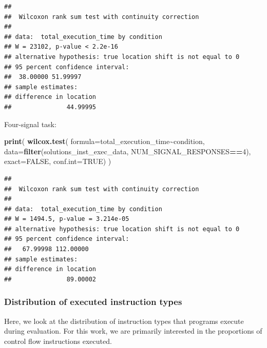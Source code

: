 \documentclass[
]{book}
\newenvironment{Shaded}{\begin{snugshade}}{\end{snugshade}}
\newcommand{\DataTypeTok}[1]{\textcolor[rgb]{0.13,0.29,0.53}{#1}}
\newcommand{\DecValTok}[1]{\textcolor[rgb]{0.00,0.00,0.81}{#1}}
\newcommand{\KeywordTok}[1]{\textcolor[rgb]{0.13,0.29,0.53}{\textbf{#1}}}
\newcommand{\NormalTok}[1]{#1}
\newcommand{\OperatorTok}[1]{\textcolor[rgb]{0.81,0.36,0.00}{\textbf{#1}}}
\newcommand{\OtherTok}[1]{\textcolor[rgb]{0.56,0.35,0.01}{#1}}
\begin{document}
\begin{verbatim}
## 
##  Wilcoxon rank sum test with continuity correction
## 
## data:  total_execution_time by condition
## W = 23102, p-value < 2.2e-16
## alternative hypothesis: true location shift is not equal to 0
## 95 percent confidence interval:
##  38.00000 51.99997
## sample estimates:
## difference in location 
##               44.99995
\end{verbatim}

Four-signal task:

\begin{Shaded}
\begin{Highlighting}[]
\KeywordTok{print}\NormalTok{(}
  \KeywordTok{wilcox.test}\NormalTok{(}
    \DataTypeTok{formula=}\NormalTok{total\_execution\_time}\OperatorTok{\textasciitilde{}}\NormalTok{condition,}
    \DataTypeTok{data=}\KeywordTok{filter}\NormalTok{(solutions\_inst\_exec\_data, NUM\_SIGNAL\_RESPONSES}\OperatorTok{==}\DecValTok{4}\NormalTok{),}
    \DataTypeTok{exact=}\OtherTok{FALSE}\NormalTok{,}
    \DataTypeTok{conf.int=}\OtherTok{TRUE}\NormalTok{)}
\NormalTok{)}
\end{Highlighting}
\end{Shaded}

\begin{verbatim}
## 
##  Wilcoxon rank sum test with continuity correction
## 
## data:  total_execution_time by condition
## W = 1494.5, p-value = 3.214e-05
## alternative hypothesis: true location shift is not equal to 0
## 95 percent confidence interval:
##   67.99998 112.00000
## sample estimates:
## difference in location 
##               89.00002
\end{verbatim}

\hypertarget{distribution-of-executed-instruction-types}{%
\subsubsection{Distribution of executed instruction types}\label{distribution-of-executed-instruction-types}}

Here, we look at the distribution of instruction types that programs execute during evaluation.
For this work, we are primarily interested in the proportions of control flow instructions executed.
\end{document}
